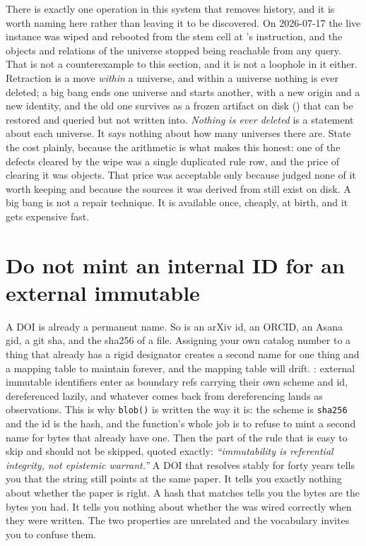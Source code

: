 There is exactly one operation in this system that removes history, and it is worth naming here rather than leaving it to be discovered. On 2026-07-17 the live instance was wiped and rebooted from the stem cell at \labPI's instruction, and the \labLineageObjects{} objects and \labLineageRelations{} relations of the \labLineageName{} universe stopped being reachable from any query. That is not a counterexample to this section, and it is not a loophole in it either. Retraction is a move \emph{within} a universe, and within a universe nothing is ever deleted; a big bang ends one universe and starts another, with a new origin and a new identity, and the old one survives as a frozen \labLineageSize{} artifact on disk (\texttt{\labLineageDump}) that can be restored and queried but not written into. \textit{Nothing is ever deleted} is a statement about each universe. It says nothing about how many universes there are. State the cost plainly, because the arithmetic is what makes this honest: one of the defects cleared by the wipe was a single duplicated rule row, and the price of clearing it was \labLineageObjects{} objects. That price was acceptable only because \labPI{} judged none of it worth keeping and because the sources it was derived from still exist on disk. A big bang is not a repair technique. It is available once, cheaply, at birth, and it gets expensive fast.

\section{Do not mint an internal ID for an external immutable}

A DOI is already a permanent name. So is an arXiv id, an ORCID, an Asana gid, a git sha, and the sha256 of a \labFileFormat{} file. Assigning your own catalog number to a thing that already has a rigid designator creates a second name for one thing and a mapping table to maintain forever, and the mapping table will drift. : external immutable identifiers enter as boundary refs carrying their own scheme and id, dereferenced lazily, and whatever comes back from dereferencing lands as observations. This is why \texttt{blob()} is written the way it is: the scheme is \texttt{sha256} and the id is the hash, and the function's whole job is to refuse to mint a second name for bytes that already have one. Then the part of the rule that is easy to skip and should not be skipped, quoted exactly: \textit{``immutability is referential integrity, not epistemic warrant.''} A DOI that resolves stably for forty years tells you that the string still points at the same paper. It tells you exactly nothing about whether the paper is right. A hash that matches tells you the bytes are the bytes you had. It tells you nothing about whether the \labLockin{} was wired correctly when they were written. The two properties are unrelated and the vocabulary invites you to confuse them.

